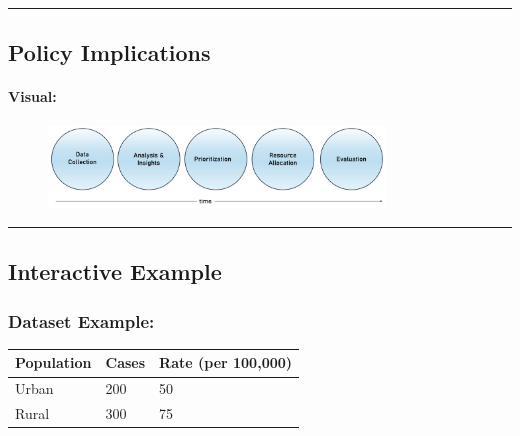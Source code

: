 \documentclass[
  letterpaper,
  DIV=11,
  numbers=noendperiod]{scrartcl}
\let\oldparagraph\paragraph
\renewcommand{\paragraph}[1]{\oldparagraph{#1}\mbox{}}
\begin{document}
\begin{center}\rule{0.5\linewidth}{0.5pt}\end{center}

\hypertarget{policy-implications-1}{%
\subsection{\texorpdfstring{{\textbf{Policy
Implications}}}{Policy Implications}}\label{policy-implications-1}}

\hypertarget{visual}{%
\paragraph{Visual:}\label{visual}}

\begin{figure}

{\centering \includegraphics[width=0.8\textwidth,height=\textheight]{week2_files/imgs/dataDrivenComparison.png}

}

\end{figure}

\begin{center}\rule{0.5\linewidth}{0.5pt}\end{center}

\hypertarget{interactive-example}{%
\subsection{\texorpdfstring{{\textbf{Interactive
Example}}}{Interactive Example}}\label{interactive-example}}

\hypertarget{dataset-example}{%
\subsubsection{\texorpdfstring{{\textbf{Dataset
Example}}:}{Dataset Example:}}\label{dataset-example}}

\begin{longtable}[]{@{}lll@{}}
\toprule\noalign{}
Population & Cases & Rate (per 100,000) \\
\midrule\noalign{}
\endhead
\bottomrule\noalign{}
\endlastfoot
Urban & 200 & 50 \\
Rural & 300 & 75 \\
\end{longtable}
\end{document}
